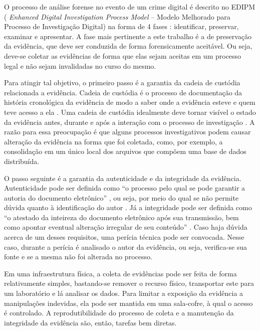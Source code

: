 O processo de análise forense no evento de um crime digital é descrito no EDIPM ( \textit{Enhanced Digital Investigation Process Model} -- Modelo Melhorado para Processo de Investigação Digital) na forma de 4 fases \cite{GrisposChallengesCloudComputing:2012}: identificar, preservar, examinar e apresentar.
%
A fase mais pertinente a este trabalho é a de preservação da evidência, que deve ser conduzida de forma forensicamente aceitável.
%
Ou seja, deve-se coletar as evidências de forma que elas sejam aceitas em um processo legal e não sejam invalidadas no curso do mesmo.


Para atingir tal objetivo, o primeiro passo é a garantia da cadeia de custódia relacionada a evidência.
%
Cadeia de custódia é o processo de documentação da história cronológica da evidência de modo a saber onde a evidência esteve e quem teve acesso a ela \cite{Ramos:2011}. 
%
Uma cadeia de custódia idealmente deve tornar visível o estado da evidência antes, durante e após a interação com o processo de investigação \cite{LuisDigitalChainOfCustody:2016}.
%
A razão para essa preocupação é que alguns processos investigativos podem causar alteração da evidência na forma que foi coletada, como, por exemplo, a consolidação em um único local dos arquivos que compõem uma base de dados distribuída.


O passo seguinte é a garantia da autenticidade e da integridade da evidência.
%
Autenticidade pode ser definida como ``o processo pelo qual se pode garantir a autoria do documento eletrônico'' \cite{Ramos:2011}, ou seja, por meio do qual se não permite dúvida quanto à identificação do autor .
%
Já a integridade pode ser definida como ``o atestado da inteireza do documento eletrônico após sua transmissão, bem como apontar eventual alteração irregular de seu conteúdo'' \cite{Ramos:2011}. 
%
Caso haja dúvida acerca de um desses requisitos, uma perícia técnica pode ser convocada.
%
Nesse caso, durante a perícia é analisado o autor da evidência, ou seja, verifica-se sua fonte e se a mesma não foi alterada no processo.


Em uma infraestrutura física, a coleta de evidências pode ser feita de forma relativamente simples, bastando-se remover o recurso físico, transportar este para um laboratório e lá analisar os dados. 
%
Para limitar a exposição da evidência a manipulações indevidas, ela pode ser mantida em uma sala-cofre, à qual o acesso é controlado.
%
A reprodutibilidade do processo de coleta e a manutenção da integridade da evidência são, então, tarefas bem diretas.


